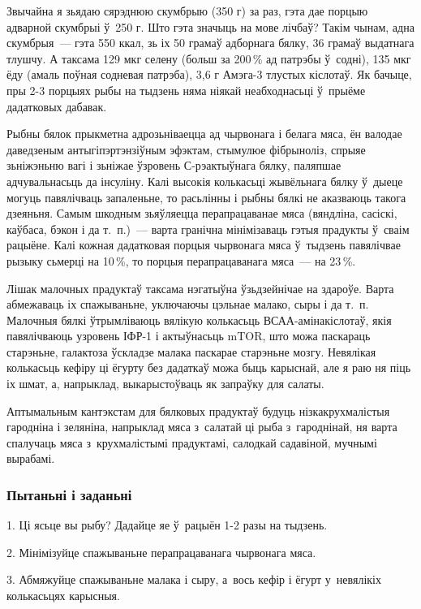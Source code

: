 Звычайна я зьядаю сярэднюю скумбрыю (350 г) за раз, гэта дае порцыю адварной скумбрыі ў~250 г. Што гэта значыць на мове лічбаў? Такім чынам, адна скумбрыя~--- гэта 550 ккал, зь іх 50 грамаў адборнага бялку, 36 грамаў выдатнага тлушчу. А таксама 129 мкг селену (больш за 200\,\% ад патрэбы ў~содні), 135 мкг ёду (амаль поўная содневая патрэба), 3,6 г Амэга-3 тлустых кіслотаў. Як бачыце, пры 2-3 порцыях рыбы на тыдзень няма ніякай неабходнасьці ў~прыёме дадатковых дабавак.

Рыбны бялок прыкметна адрозьніваецца ад чырвонага і белага мяса, ён валодае даведзеным антыгіпэртэнзіўным эфэктам, стымулюе фібрыноліз, спрыяе зьніжэньню вагі і зьніжае ўзровень С-рэактыўнага бялку, паляпшае адчувальнасьць да інсуліну. Калі высокія колькасьці жывёльнага бялку ў~дыеце могуць павялічваць запаленьне, то расьлінны і рыбны бялкі не аказваюць такога дзеяньня. Самым шкодным зьяўляецца перапрацаванае мяса (вяндліна, сасіскі, каўбаса, бэкон і да т.~п.)~--- варта гранічна мінімізаваць гэтыя прадукты ў~сваім рацыёне. Калі кожная дадатковая порцыя чырвонага мяса ў~тыдзень павялічвае рызыку сьмерці на 10\,\%, то порцыя перапрацаванага мяса~--- на 23\,\%.

Лішак малочных прадуктаў таксама нэгатыўна ўзьдзейнічае на здароўе. Варта абмежаваць іх спажываньне, уключаючы цэльнае малако, сыры і да т.~п. Малочныя бялкі ўтрымліваюць вялікую колькасьць ВСАА-амінакіслотаў, якія павялічваюць узровень ІФР-1 і актыўнасьць mTOR, што можа паскараць старэньне, галактоза ўскладзе малака паскарае старэньне мозгу. Невялікая колькасьць кефіру ці ёгурту без дадаткаў можа быць карыснай, але я раю ня піць іх шмат, а, напрыклад, выкарыстоўваць як запраўку для салаты.

Аптымальным кантэкстам для бялковых прадуктаў будуць нізкакрухмалістыя гародніна і зеляніна, напрыклад мяса з~салатай ці рыба з~гароднінай, ня варта спалучаць мяса з~крухмалістымі прадуктамі, салодкай садавіной, мучнымі вырабамі.

\subsubsection{Пытаньні і заданьні}

1. Ці ясьце вы рыбу? Дадайце яе ў~рацыён 1-2 разы на тыдзень.

2. Мінімізуйце спажываньне перапрацаванага чырвонага мяса.

3. Абмяжуйце спажываньне малака і сыру, а~вось кефір і ёгурт у~невялікіх колькасьцях карысныя.


